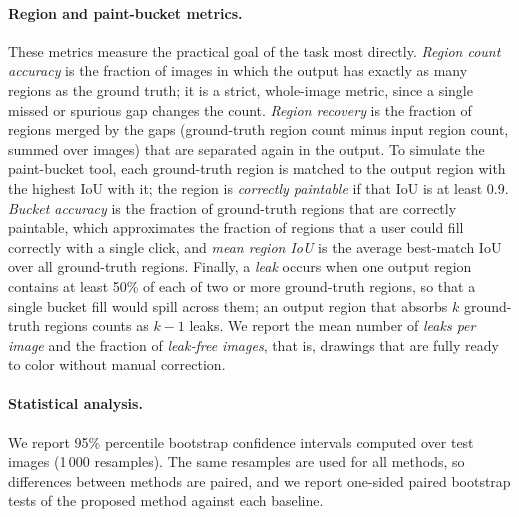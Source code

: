 \documentclass[preprint,12pt]{elsarticle}
\begin{document}
\paragraph{Region and paint-bucket metrics.} These metrics measure the practical goal
of the task most directly. \emph{Region count accuracy} is the fraction of images in
which the output has exactly as many regions as the ground truth; it is a strict,
whole-image metric, since a single missed or spurious gap changes the count.
\emph{Region recovery} is the fraction of regions merged by the gaps (ground-truth
region count minus input region count, summed over images) that are separated again
in the output. To simulate the paint-bucket tool, each ground-truth region is matched
to the output region with the highest IoU with it; the region is \emph{correctly
paintable} if that IoU is at least 0.9. \emph{Bucket accuracy} is the fraction of
ground-truth regions that are correctly paintable, which approximates the fraction of
regions that a user could fill correctly with a single click, and \emph{mean region
IoU} is the average best-match IoU over all ground-truth regions. Finally, a
\emph{leak} occurs when one output region contains at least 50\% of each of two or
more ground-truth regions, so that a single bucket fill would spill across them; an
output region that absorbs $k$ ground-truth regions counts as $k-1$ leaks. We report
the mean number of \emph{leaks per image} and the fraction of \emph{leak-free images},
that is, drawings that are fully ready to color without manual correction.

\paragraph{Statistical analysis.} We report 95\% percentile bootstrap confidence
intervals \citep{efron1994bootstrap} computed over test images (1\,000 resamples).
The same resamples are used for all methods, so differences between methods are
paired, and we report one-sided paired bootstrap tests of the proposed method against
each baseline.
\end{document}
